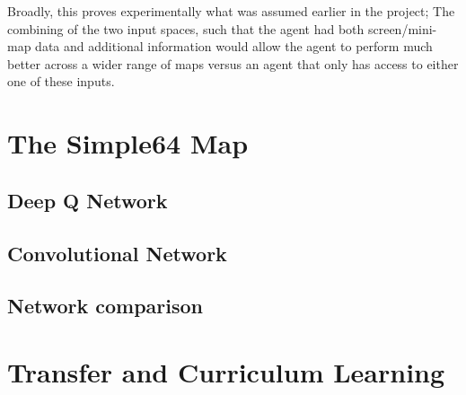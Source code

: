 Broadly, this proves experimentally what was assumed earlier in the project;
The combining of the two input spaces, such that the agent had both
screen/mini-map data and additional information would allow the agent to perform
much better across a wider range of maps versus an agent that only has access to
either one of these inputs.

\section{The Simple64 Map}

\subsection{Deep Q Network}

\subsection{Convolutional Network}

\subsection{Network comparison}


\section{Transfer and Curriculum Learning}

